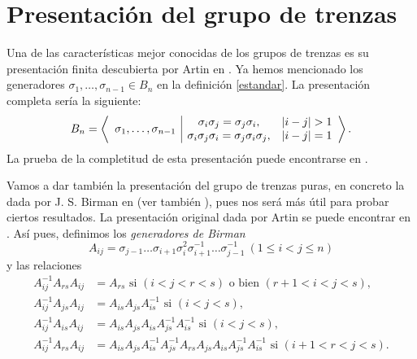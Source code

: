 \documentclass[TFG.tex]{subfiles}
\begin{document}

\newpage

\section{Presentación del grupo de trenzas}
Una de las características mejor conocidas de los grupos de trenzas es su presentación finita descubierta por Artin en \cite{Artin}. Ya hemos mencionado los generadores $\sigma_1,\dots,\sigma_{n-1}\in B_n$ en la definición \ref{estandar}. La presentación completa sería la siguiente:
\begin{equation}\label{presentacion}
B_n=\left\langle\begin{array}{c| c c}
\multirow{2}{*}{$\sigma_1,\dots,\sigma_{n-1}$} & \sigma_i\sigma_j=\sigma_j\sigma_i, & |i-j|>1\\
& \sigma_i\sigma_j\sigma_i=\sigma_j\sigma_i\sigma_j, & |i-j|=1
\end{array}\right\rangle.
\end{equation}
La prueba de la completitud de esta presentación puede encontrarse en \cite{Magnus}. 

Vamos a dar también la presentación del grupo de trenzas puras, en concreto la dada por J. S. Birman en \cite{Birman} (ver también \cite{polynomial}), pues nos será más útil para probar ciertos resultados. La presentación original dada por Artin se puede encontrar en \cite{Artin}. Así pues, definimos los \emph{generadores de Birman}
\begin{equation}\label{birman}
A_{ij}=\sigma_{j-1}\dots\sigma_{i+1}\sigma_i^2\sigma_{i+1}^{-1}\dots\sigma_{j-1}^{-1}\ (1\leq i<j\leq n)
\end{equation}
y las relaciones %
\begin{align*}
A_{ij}^{-1}A_{rs}A_{ij}&=A_{rs}\text{ si } (i<j<r<s)\text{ o bien } (r+1<i<j<s),\\
A_{ij}^{-1}A_{js}A_{ij}&=A_{is}A_{js}A_{is}^{-1} \text{ si } (i<j<s),\\
A_{ij}^{-1}A_{is}A_{ij}&=A_{is}A_{js}A_{is}A_{js}^{-1}A_{is}^{-1}\text{ si } (i<j<s),\\
A_{ij}^{-1}A_{rs}A_{ij}&=A_{is}A_{js}A_{is}^{-1}A_{js}^{-1}A_{rs}A_{js}A_{is}A_{js}^{-1}A_{is}^{-1}\text{ si } (i+1<r<j<s).
\end{align*}
\end{document}
